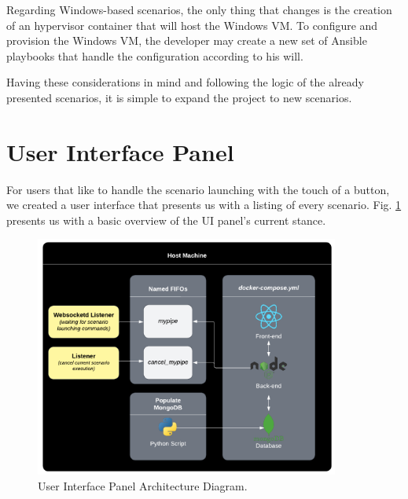 Regarding Windows-based scenarios, the only thing that changes is the creation of an hypervisor container that will host the Windows VM. To configure and provision the Windows VM, the developer may create a new set of Ansible playbooks that handle the configuration according to his will.

Having these considerations in mind and following the logic of the already presented scenarios, it is simple to expand the project to new scenarios. 


\section{User Interface Panel} \label{sec:validation_ui}

For users that like to handle the scenario launching with the touch of a button, we created a user interface that presents us with a listing of every scenario. Fig. \ref{fig:ui_architecture_diagram} presents us with a basic overview of the UI panel's current stance.

\begin{figure}[H]
    \includegraphics[width=10cm]{figures/ui_diagram.pdf}
    \caption{User Interface Panel Architecture Diagram.}
    \label{fig:ui_architecture_diagram}
\end{figure}

